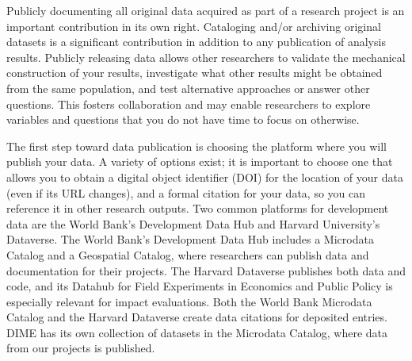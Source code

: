Publicly documenting all original data acquired as part of a research project
is an important contribution in its own right.
Cataloging and/or archiving original datasets
is a significant contribution in addition to any publication of analysis results.
Publicly releasing data allows other researchers
to validate the mechanical construction of your results,
investigate what other results might be obtained from the same population,
and test alternative approaches or answer other questions.
This fosters collaboration and may enable researchers to explore variables and
questions that you do not have time to focus on otherwise.

The first step toward data publication is choosing the platform
where you will publish your data.
A variety of options exist;
it is important to choose one that allows you to obtain a digital object identifier (DOI)
for the location of your data (even if its URL changes),
and a formal citation for your data, so you can reference it in other research outputs.
Two common platforms for development data are the World Bank's Development Data Hub
and Harvard University's Dataverse.
The World Bank's Development Data Hub
includes a Microdata Catalog
and a Geospatial Catalog,
where researchers can publish data and documentation for their projects.
The Harvard Dataverse publishes both data and code,
and its Datahub for Field Experiments in Economics and Public Policy
is especially relevant for impact evaluations.
Both the World Bank Microdata Catalog and the Harvard Dataverse
create data citations for deposited entries.
DIME has its own collection of datasets in the Microdata Catalog,
where data from our projects is published.

